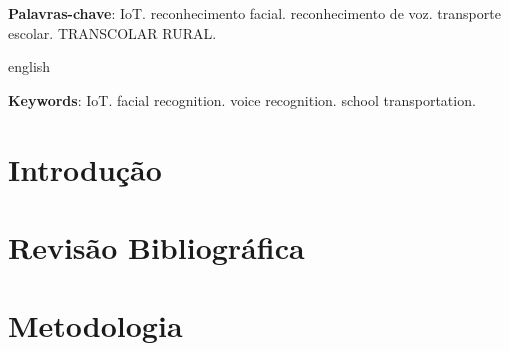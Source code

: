 \documentclass[
    12pt,
    openright,
    twoside,
    a4paper,
    chapter=TITLE,
    section=TITLE,
    english,
    brazil
    ]{abntex2}
\begin{document}
\begin{resumo}

    \vspace{\onelineskip}
    \noindent
    \textbf{Palavras-chave}: IoT. reconhecimento facial. reconhecimento de voz. transporte escolar. TRANSCOLAR RURAL.
\end{resumo}

\begin{resumo}[Abstract]
    \begin{otherlanguage*}{english}

        \vspace{\onelineskip}
        \noindent
        \textbf{Keywords}: IoT. facial recognition. voice recognition. school transportation.
    \end{otherlanguage*}
\end{resumo}

\tableofcontents*
\cleardoublepage

\textual

\chapter{Introdução}

\chapter{Revisão Bibliográfica}

\chapter{Metodologia}
\end{document}
